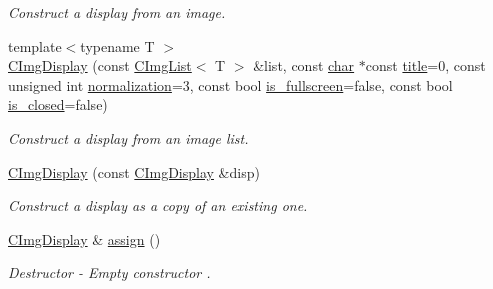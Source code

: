\begin{DoxyCompactItemize}
\begin{DoxyCompactList}\small\item\em Construct a display from an image. \end{DoxyCompactList}\item 
{\footnotesize template$<$typename T $>$ }\\\hyperlink{structcimg__library__suffixed_1_1CImgDisplay_a813929ae7e9f9b50846134f383fef57a}{C\+Img\+Display} (const \hyperlink{structcimg__library__suffixed_1_1CImgList}{C\+Img\+List}$<$ T $>$ \&list, const \hyperlink{classchar}{char} $\ast$const \hyperlink{structcimg__library__suffixed_1_1CImgDisplay_aec4c62a5a049354df77d22f6fe91e95c}{title}=0, const unsigned int \hyperlink{structcimg__library__suffixed_1_1CImgDisplay_a79b6f929fe4aaf411051fc85862191a7}{normalization}=3, const bool \hyperlink{structcimg__library__suffixed_1_1CImgDisplay_a1de2d56a94961193ef833b502120d67e}{is\+\_\+fullscreen}=false, const bool \hyperlink{structcimg__library__suffixed_1_1CImgDisplay_a6fa9d8294099dc9e1e6f67cc67e159c6}{is\+\_\+closed}=false)
\begin{DoxyCompactList}\small\item\em Construct a display from an image list. \end{DoxyCompactList}\item 
\hyperlink{structcimg__library__suffixed_1_1CImgDisplay_a1017f6d948d5066c10454e733043b06f}{C\+Img\+Display} (const \hyperlink{structcimg__library__suffixed_1_1CImgDisplay}{C\+Img\+Display} \&disp)
\begin{DoxyCompactList}\small\item\em Construct a display as a copy of an existing one. \end{DoxyCompactList}\item 
\hyperlink{structcimg__library__suffixed_1_1CImgDisplay}{C\+Img\+Display} \& \hyperlink{structcimg__library__suffixed_1_1CImgDisplay_a93447fdffa6c250ebc03e62e9279d603}{assign} ()
\begin{DoxyCompactList}\small\item\em Destructor -\/ Empty constructor . \end{DoxyCompactList}\item 
\mbox{\label{structcimg__library__suffixed_1_1CImgDisplay_a316edd54f58ad7fa3fdbb439f1b34177}} 

\end{DoxyCompactItemize}
